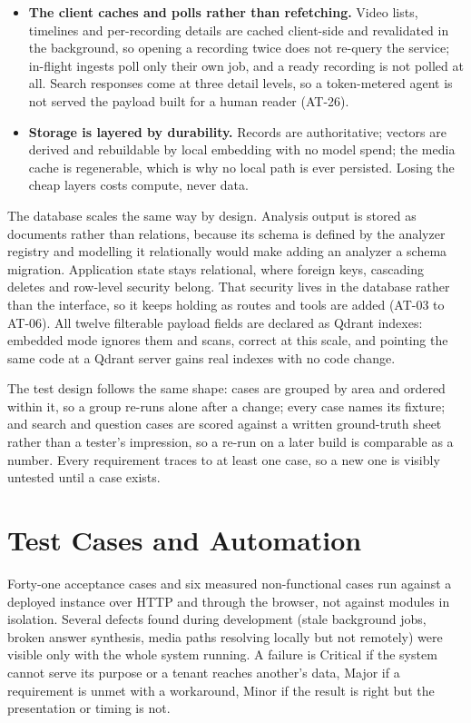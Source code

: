 \documentclass[11pt,a4paper]{article}
\begin{document}
\begin{itemize}
  \item \textbf{The client caches and polls rather than refetching.} Video lists, timelines
        and per-recording details are cached client-side and revalidated in the background,
        so opening a recording twice does not re-query the service; in-flight ingests poll
        only their own job, and a ready recording is not polled at all. Search responses
        come at three detail levels, so a token-metered agent is not served the payload
        built for a human reader (AT-26).

  \item \textbf{Storage is layered by durability.} Records are authoritative; vectors are
        derived and rebuildable by local embedding with no model spend; the media cache is
        regenerable, which is why no local path is ever persisted. Losing the cheap layers
        costs compute, never data.
\end{itemize}

The database scales the same way by design. Analysis output is stored as documents rather
than relations, because its schema is defined by the analyzer registry and modelling it
relationally would make adding an analyzer a schema migration. Application state stays
relational, where foreign keys, cascading deletes and row-level security belong. That security lives in the database rather than the interface, so it keeps holding as
routes and tools are added (AT-03 to AT-06). All twelve filterable payload fields are
declared as Qdrant indexes: embedded mode ignores them and scans, correct at this scale,
and pointing the same code at a Qdrant server gains real indexes with no code change.

The test design follows the same shape: cases are grouped by area and ordered within it, so
a group re-runs alone after a change; every case names its fixture; and search and question
cases are scored against a written ground-truth sheet rather than a tester's impression, so
a re-run on a later build is comparable as a number. Every requirement traces to at least
one case, so a new one is visibly untested until a case exists.

\section{Test Cases and Automation}

Forty-one acceptance cases and six measured non-functional cases run against a deployed
instance over HTTP and through the browser, not against modules in isolation. Several
defects found during development (stale background jobs, broken answer synthesis, media
paths resolving locally but not remotely) were visible only with the whole system running.
A failure is Critical if the system cannot serve its purpose or a tenant reaches another's
data, Major if a requirement is unmet with a workaround, Minor if the result is right but
the presentation or timing is not.
\end{document}
